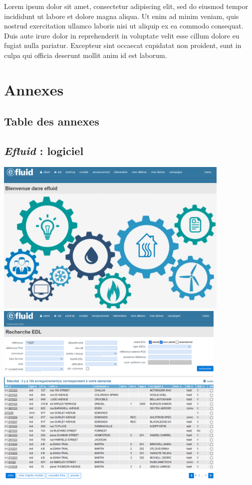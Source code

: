 \documentclass[a4paper, 12pt]{report}
\begin{document}
Lorem ipsum dolor sit amet, consectetur adipiscing elit, sed do eiusmod tempor incididunt ut labore et dolore magna aliqua. Ut enim ad minim veniam, quis nostrud exercitation ullamco laboris nisi ut aliquip ex ea commodo consequat. Duis aute irure dolor in reprehenderit in voluptate velit esse cillum dolore eu fugiat nulla pariatur. Excepteur sint occaecat cupidatat non proident, sunt in culpa qui officia deserunt mollit anim id est laborum.

\part{Annexes}
\renewcommand{\clearpage}{}
\chapter*{Table des annexes}
\renewcommand\ptctitle{}
\parttoc
\thispagestyle{empty}
\renewcommand{\clearpage}{\newpage}
\appendix

\chapter{\textit{Efluid} : logiciel}
\label{appendix:logiciel}

\begin{center}
  \includegraphics[height=7.5cm]{../res/efluid-1.png}
  \null
  \vspace{0.3cm}
  \includegraphics[height=9cm]{../res/efluid-2.png}
\end{center}
\end{document}
